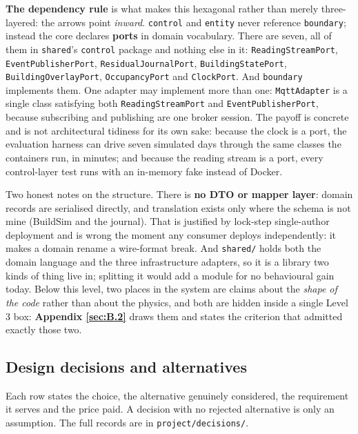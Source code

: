 \textbf{The dependency rule} is what makes this hexagonal rather than merely three-layered: the
arrows point \emph{inward}. \texttt{control} and \texttt{entity} never reference
\texttt{boundary}; instead the core declares \textbf{ports} in domain vocabulary. There are seven,
all of them in \texttt{shared}'s \texttt{control} package and nothing else in it:
\texttt{ReadingStreamPort}, \texttt{EventPublisherPort}, \texttt{ResidualJournalPort},
\texttt{BuildingStatePort}, \texttt{BuildingOverlayPort}, \texttt{OccupancyPort} and
\texttt{ClockPort}. And \texttt{boundary} implements them. One adapter may implement more than
one: \texttt{MqttAdapter} is a single class satisfying both \texttt{ReadingStreamPort} and
\texttt{EventPublisherPort}, because subscribing and publishing are one broker session. The payoff is concrete and is not architectural tidiness for
its own sake: because the clock is a port, the evaluation harness can drive seven simulated days
through the same classes the containers run, in minutes; and because the reading stream is a port,
every control-layer test runs with an in-memory fake instead of Docker.

Two honest notes on the structure. There is \textbf{no DTO or mapper layer}: domain records are
serialised directly, and translation exists only where the schema is not mine (BuildSim and the
journal). That is justified by lock-step single-author deployment and is wrong the moment any
consumer deploys independently: it makes a domain rename a wire-format break. And
\texttt{shared/} holds both the domain language and the three infrastructure adapters, so it is a
library two kinds of thing live in; splitting it would add a module for no behavioural gain today. Below
this level, two places in the system are claims about the \emph{shape of the code} rather than about
the physics, and both are hidden inside a single Level 3 box: \textbf{Appendix \ref{sec:B.2}} draws them
and states the criterion that admitted exactly those two.

\subsection{Design decisions and alternatives}\label{sec:4.5}

Each row states the choice, the alternative genuinely considered, the requirement it serves and
the price paid. A decision with no rejected alternative is only an assumption. The full records
are in \texttt{project/decisions/}.

